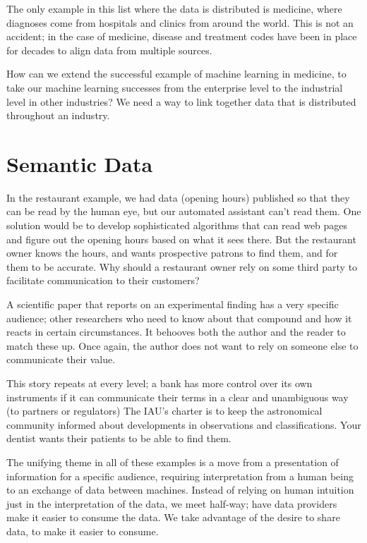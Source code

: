 The only example in this list where the data is distributed is medicine, where diagnoses come 
from hospitals and clinics from around the world.  This is not an accident; in the case of medicine, 
disease and treatment codes have been in place for decades to align data from multiple sources. 

How can we extend the successful example of machine learning in medicine, to take 
our machine learning successes from the enterprise level to the industrial level in other industries? 
We need a way to link together data that is distributed throughout an industry. 




\section{Semantic Data}

In the restaurant example, we had data (opening hours) published so that they 
can be read by the human eye, but our automated assistant can't read them.  One solution 
would be to develop sophisticated algorithms that can read web pages and figure out
the opening hours based on what it sees there.  But the restaurant owner knows the hours, 
and wants prospective patrons to find them, and for them to be accurate.  Why should 
a restaurant owner rely on some third party to facilitate communication to their customers?  

A scientific paper that reports on an experimental finding has a very specific audience;
other researchers who need to know about that compound and how it reacts in certain circumstances. 
It behooves both the author and the reader to match these up.  Once again, the author does not
want to rely on someone else to communicate their value. 

This story repeats at every level; a bank has more control over its own instruments if it 
can communicate their terms in a clear and unambiguous way (to partners or regulators)
The IAU's charter is to keep the astronomical community informed about developments in 
observations and classifications.  Your dentist wants their patients to be able to find them. 

The unifying theme in all of these examples is a move from a presentation of information 
for a specific audience, requiring interpretation from a human being to an exchange of data
between machines.  Instead of relying on human intuition just in the interpretation of the
data, we meet half-way; have data providers make it easier to consume the data.  We take advantage of 
the desire to share data, to make it easier to consume. 

